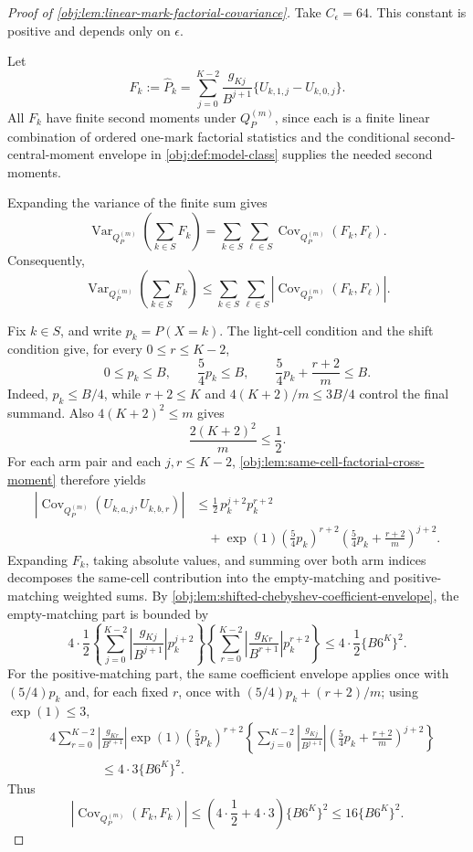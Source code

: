 \begin{proof}[Proof of \cref{obj:lem:linear-mark-factorial-covariance}]
Take \(C_\epsilon=64\).  This constant is positive and depends only on \(\epsilon\).

Let
\[
F_k
:=
\widehat P_k
=
\sum_{j=0}^{K-2}\frac{g_{Kj}}{B^{j+1}}
\{U_{k,1,j}-U_{k,0,j}\}.
\]
All \(F_k\) have finite second moments under \(Q_P^{(m)}\), since each is a finite linear combination of ordered one-mark factorial statistics and the conditional second-central-moment envelope in \cref{obj:def:model-class} supplies the needed second moments.

Expanding the variance of the finite sum gives
\[
\operatorname{Var}_{Q_P^{(m)}}\!\left(\sum_{k\in S}F_k\right)
=
\sum_{k\in S}\sum_{\ell\in S}
\operatorname{Cov}_{Q_P^{(m)}}(F_k,F_\ell).
\]
Consequently,
\[
\operatorname{Var}_{Q_P^{(m)}}\!\left(\sum_{k\in S}F_k\right)
\le
\sum_{k\in S}\sum_{\ell\in S}
\left|\operatorname{Cov}_{Q_P^{(m)}}(F_k,F_\ell)\right|.
\]

Fix \(k\in S\), and write \(p_k=P(X=k)\).  The light-cell condition and the shift condition give, for every \(0\le r\le K-2\),
\[
0\le p_k\le B,
\qquad
\frac54p_k\le B,
\qquad
\frac54p_k+\frac{r+2}{m}\le B.
\]
Indeed, \(p_k\le B/4\), while \(r+2\le K\) and \(4(K+2)/m\le3B/4\) control the final summand.  Also \(4(K+2)^2\le m\) gives
\[
\frac{2(K+2)^2}{m}\le \frac12.
\]
For each arm pair and each \(j,r\le K-2\), \cref{obj:lem:same-cell-factorial-cross-moment} therefore yields
\[
\begin{aligned}
\left|\operatorname{Cov}_{Q_P^{(m)}}(U_{k,a,j},U_{k,b,r})\right|
&\le
\frac12\,p_k^{j+2}p_k^{r+2} \\
&\quad+
\exp(1)\left(\frac54p_k\right)^{r+2}
\left(\frac54p_k+\frac{r+2}{m}\right)^{j+2}.
\end{aligned}
\]
Expanding \(F_k\), taking absolute values, and summing over both arm indices decomposes the same-cell contribution into the empty-matching and positive-matching weighted sums.  By \cref{obj:lem:shifted-chebyshev-coefficient-envelope}, the empty-matching part is bounded by
\[
4\cdot\frac12
\left\{
\sum_{j=0}^{K-2}
\left|\frac{g_{Kj}}{B^{j+1}}\right|p_k^{j+2}
\right\}
\left\{
\sum_{r=0}^{K-2}
\left|\frac{g_{Kr}}{B^{r+1}}\right|p_k^{r+2}
\right\}
\le
4\cdot\frac12\{B6^K\}^2.
\]
For the positive-matching part, the same coefficient envelope applies once with \((5/4)p_k\) and, for each fixed \(r\), once with \((5/4)p_k+(r+2)/m\); using \(\exp(1)\le3\),
\[
\begin{aligned}
&4\sum_{r=0}^{K-2}
\left|\frac{g_{Kr}}{B^{r+1}}\right|
\exp(1)\left(\frac54p_k\right)^{r+2}
\left\{
\sum_{j=0}^{K-2}
\left|\frac{g_{Kj}}{B^{j+1}}\right|
\left(\frac54p_k+\frac{r+2}{m}\right)^{j+2}
\right\} \\
&\hspace{4em}\le
4\cdot3\{B6^K\}^2.
\end{aligned}
\]
Thus
\[
\left|\operatorname{Cov}_{Q_P^{(m)}}(F_k,F_k)\right|
\le
\left(4\cdot\frac12+4\cdot3\right)\{B6^K\}^2
\le
16\{B6^K\}^2 .
\]


\end{proof}
